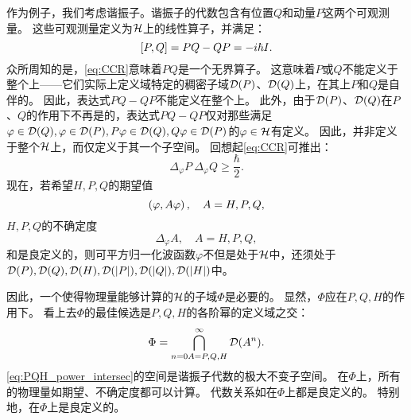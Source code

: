 作为例子，我们考虑谐振子。谐振子的代数包含有位置\(Q\)和动量\(P\)这两个可观测量。
这些可观测量定义为\(\mathcal H\)上的线性算子，并满足\ccr：
\[\label{eq:CCR}
	\left[P,Q\right]= PQ-QP=-i\hbar I.\]
众所周知的是，\cref{eq:CCR}意味着\(P\)\(Q\)是一个无界算子。
这意味着\(P\)或\(Q\)不能定义于整个\hs 上——它们实际上定义域特定的稠密子域\(\mathcal D(P)\)、\(\mathcal D(Q)\)上，在其上\(P\)和\(Q\)是自伴的。
因此，表达式\(PQ-QP\)不能定义在整个\hs 上。
此外，由于\(\mathcal D(P)\)、\(\mathcal D(Q)\)在\(P\)、\(Q\)的作用下不再是的，表达式\(PQ-QP\)仅对那些满足\(\varphi\in\mathcal D(Q),\varphi\in\mathcal D(P),P\varphi\in\mathcal D(Q),Q\varphi\in\mathcal D(P)\)的\(\varphi\in\mathcal H\)有定义。
因此，并非定义于整个\(\mathcal H\)上，而仅定义于其一个子空间。
回想起\cref{eq:CCR}可推出\hur：
\[\label{eq:HUR}
	\Delta_\varphi P\ \Delta_\varphi Q\geq\frac{\hbar}{2}.\]
现在，若希望\(H,P,Q\)的期望值
\[\left(\varphi,A\varphi\right),\quad A=H,P,Q,\]
\(H,P,Q\)的不确定度
\[\label{eq:uncertainty_HPQ}
	\Delta_\varphi A,\quad A=H,P,Q,\]
和是良定义的，则可平方归一化波函数\(\varphi\)不但是处于\(\mathcal H\)中，还须处于\(\mathcal D(P),\mathcal D(Q),\mathcal D(H),\mathcal D(|P|),\mathcal D(|Q|),\mathcal D(|H|)\)中。

因此，一个使得物理量能够计算的\(\mathcal H\)的子域\(\Phi\)是必要的。
显然，\(\Phi\)应在\(P,Q,H\)的作用下。
看上去\(\Phi\)的最佳候选是\(P,Q,H\)的各阶幂的定义域之交：
\[\label{eq:PQH_power_intersec}
	\Phi=\bigcap_{n=0\\A=P,Q,H}^\infty\mathcal D(A^n).\]
\cref{eq:PQH_power_intersec}的空间是谐振子代数的极大不变子空间。
在\(\Phi\)上，所有的物理量如期望、不确定度都可以计算。
代数关系如\ccr 在\(\Phi\)上都是良定义的。
特别地，\hur 在\(\Phi\)上是良定义的。

